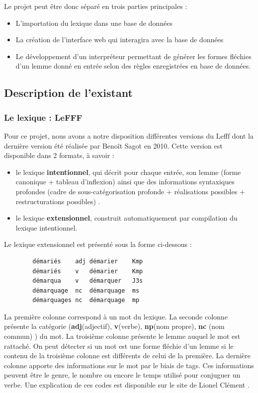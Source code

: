 \documentclass[12pt,a4paper]{article}
\begin{document}
    Le projet peut être donc séparé en trois parties principales :
    \begin{itemize}
        \item L'importation du lexique dans une base de données
        \item La création de l'interface web qui interagira avec la base de données
        \item Le développement d'un interpréteur permettant de générer les formes fléchies d'un lemme donné en entrée selon des règles enregistrées en base de données.
    \end{itemize}

    \subsection{Description de l'existant}
    \subsubsection{Le lexique : LeFFF}
    Pour ce projet, nous avons a notre disposition différentes versions du Lefff dont la dernière version été réalisée par Benoît Sagot en 2010. Cette version est disponible dans 2 formats, à savoir \cite{lefff_int} :
    \begin{itemize}
        \item le lexique \textbf{intentionnel}, qui décrit pour chaque entrée, son lemme (forme canonique + tableau d'inflexion) ainsi que des informations syntaxiques profondes (cadre de sous-catégorisation profonde + réalisations possibles + restructurations possibles) .
        \item le lexique \textbf{extensionnel}, construit automatiquement par compilation du lexique intentionnel.
    \end{itemize}

    \smallbreak
    Le lexique extensionnel est présenté sous la forme ci-dessous :
    \begin{verbatim}
        démariés	adj	démarier	Kmp
        démariés	v	démarier	Kmp
        démarqua	v	démarquer	J3s
        démarquage	nc	démarquage	ms
        démarquages	nc	démarquage	mp
    \end{verbatim}

    \smallbreak La première colonne correspond à un mot du lexique.
    \smallbreak La seconde colonne présente la catégorie (\textbf{adj}(adjectif), \textbf{v}(verbe), \textbf{np}(nom propre), \textbf{nc} (nom commun) ) du mot.
    \smallbreak La troisième colonne présente le lemme auquel le mot est rattaché.
    On peut détecter si un mot est une forme fléchie d'un lemme si le contenu de la troisième colonne est différents de celui de la première.
    \smallbreak La dernière colonne apporte des informations sur le mot par le biais de tags. Ces informations peuvent être
    le genre, le nombre ou encore le temps utilisé pour conjuguer un verbe.
    Une explication de ces codes est disponible sur le site de Lionel Clément \cite{tagset}.
\end{document}
